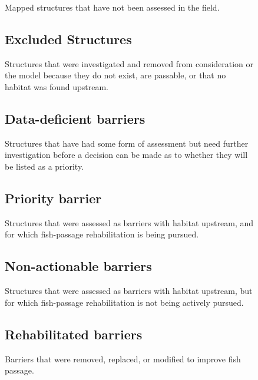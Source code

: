 \documentclass[
  letterpaper,
  DIV=11,
  numbers=noendperiod]{scrreprt}
\begin{document}
\begin{figure}
{Mapped structures that have not been assessed in the field.

\subsection*{Excluded Structures}\label{excluded-structures}

Structures that were investigated and removed from consideration or the
model because they do not exist, are passable, or that no habitat was
found upstream.

\subsection*{Data-deficient barriers}\label{data-deficient-barriers}

Structures that have had some form of assessment but need further
investigation before a decision can be made as to whether they will be
listed as a priority.

\subsection*{Priority barrier}\label{priority-barrier}

Structures that were assessed as barriers with habitat upstream, and for
which fish-passage rehabilitation is being pursued.

\subsection*{Non-actionable barriers}\label{non-actionable-barriers}

Structures that were assessed as barriers with habitat upstream, but for
which fish-passage rehabilitation is not being actively pursued.

\subsection*{Rehabilitated barriers}\label{rehabilitated-barriers}

Barriers that were removed, replaced, or modified to improve fish
passage.


}
\end{figure}
\end{document}
